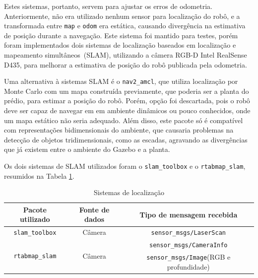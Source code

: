 \documentclass[repeatfields,xlists,xpacks,oneside,yearsonly]{ufrgscca}
\begin{document}
Estes sistemas, portanto, servem para ajustar os erros de odometria.
Anteriormente, não era utilizado nenhum sensor para localização do
robô, e a transformada entre \texttt{map} e \texttt{odom} era
estática, causando divergência na estimativa de posição durante a
navegação. Este sistema foi mantido para testes, porém foram
implementados dois sistemas de localização baseados em localização e
mapeamento simultâneos~(SLAM), utilizando a câmera RGB-D Intel
RealSense D435, para melhorar a estimativa de posição do robô
publicada pela odometria.

Uma alternativa à sistemas SLAM é o \texttt{nav2\_amcl}, que utiliza
localização por Monte Carlo com um mapa construída previamente, que
poderia ser a planta do prédio, para estimar a posição do robô.
Porém, opção foi descartada, pois o robô deve ser capaz de navegar em
em ambiente dinâmicos ou pouco conhecidos, onde um mapa estático não
seria adequado. Além disso, este pacote só é compatível com
representações bidimensionais do ambiente, que causaria problemas na
detecção de objetos tridimensionais, como as escadas, agravando as
divergências que já existem entre o ambiente do Gazebo e a planta.

Os dois sistemas de SLAM utilizados foram o \texttt{slam\_toolbox} e
o \texttt{rtabmap\_slam}, resumidos na Tabela \ref{tab:localizacao}.

\begin{table}[h]
    \begin{center}
        \caption{Sistemas de localização}
        \label{tab:localizacao}
        \begin{tabular}{c|c|c}
            Pacote utilizado                        & Fonte de dados          & Tipo de mensagem recebida                       \\
            \hline
            \texttt{slam\_toolbox}                  & Câmera                  & \texttt{sensor\_msgs/LaserScan}                 \\
            \hline
            \multirow{2}{*}{\texttt{rtabmap\_slam}} & \multirow{2}{*}{Câmera} & \texttt{sensor\_msgs/CameraInfo}                \\
                                                    &                         & \texttt{sensor\_msgs/Image}(RGB e profundidade) \\
        \end{tabular}
    \end{center}
\end{table}
\end{document}
